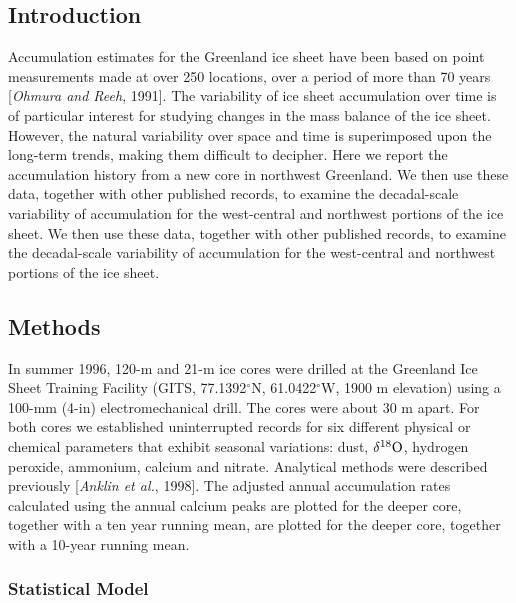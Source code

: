 \documentclass[jgrga]{agu2001}
\begin{document}
\begin{article}
\section{Introduction}

Accumulation estimates for the Greenland ice sheet have been based on
point measurements made at over 250 locations, over a period of more than 70 years
[{\it Ohmura and Reeh}, 1991].
\nocite{OhmRee91}
The variability of ice sheet accumulation over time is of particular interest
for studying changes in the mass balance of the ice sheet.
However, the natural variability over space and time is superimposed upon the
long-term trends, making them difficult to decipher.
Here we report the accumulation history from a new core
in northwest Greenland.
We then use these data, together with other
published records, to examine the decadal-scale variability of accumulation
for the west-central and northwest portions of the ice sheet.
We then use these data, together with other
published records, to examine the decadal-scale variability of accumulation
for the west-central and northwest portions of the ice sheet.

\subsection{Methods}
In summer 1996, 120-m and 21-m ice cores
were drilled at the Greenland Ice Sheet
Training Facility (GITS, 77.1392$^\circ$N, 61.0422$^\circ$W,
1900 m elevation)
using a 100-mm (4-in) electromechanical drill.
The cores were about 30 m apart.
For both cores we established uninterrupted
records for six different physical or chemical
parameters that exhibit seasonal variations:
dust, $\delta^{18} \rm O$, hydrogen peroxide, ammonium, calcium and nitrate.
Analytical methods were described previously [{\it Anklin et al.}, 1998]. 
The adjusted annual accumulation rates calculated using the annual calcium 
peaks
are plotted 
for the deeper core,
together with a  ten year running mean,
are plotted 
for the deeper core,
together with a 10-year running mean.


\subsubsection{Statistical Model}


\end{article}
\end{document}
